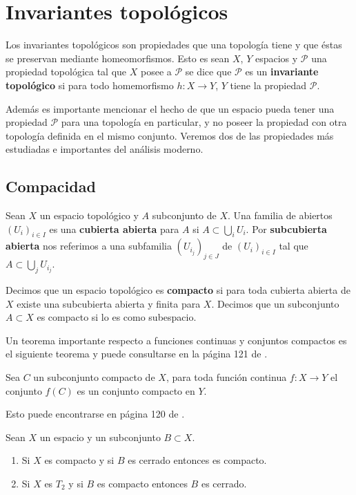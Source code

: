 \section*{Invariantes topológicos}

Los invariantes topológicos son propiedades que una topología tiene y que éstas se preservan mediante homeomorfismos. Esto es sean $X$, $Y$ espacios y $\mathcal{P}$ una propiedad topológica tal que $X$ posee a $\mathcal{P}$ se dice que $\mathcal{P}$ es un \textbf{invariante topológico} si para todo homemorfismo $h:X \to Y$,  $Y$ tiene la propiedad $\mathcal{P}$.


Además es importante mencionar el hecho de que un espacio pueda tener una propiedad $\mathcal{P}$ para una topología en particular, y no poseer la propiedad con otra topología definida en el mismo conjunto. Veremos dos de las  propiedades más estudiadas e 
importantes del análisis moderno. 

\subsection*{Compacidad}

\begin{df}
Sean $X$ un espacio topológico y  $A$ subconjunto de $X$. Una familia de abiertos $(U_i)_{i \in I}$ es una \textbf{cubierta abierta} para $A$ si $A \subset \bigcup_i U_i.$ Por \textbf{subcubierta abierta} nos referimos a una subfamilia $(U_{i_j} )_{j \in J}$ de $(U_i)_{i \in I}$ tal que $ A \subset \bigcup_j U_{i_j}.$

Decimos que un espacio topológico es \textbf{compacto} si para toda cubierta abierta de $X$ existe una subcubierta abierta y finita para $X$. Decimos que un subconjunto $A \subset X$ es compacto si lo es como subespacio.
\end{df}

Un teorema importante respecto a funciones continuas y conjuntos compactos es el siguiente teorema y puede consultarse en la  página 121 de \cite{top_willd}.
 
\begin{te}
Sea $C$ un subconjunto compacto de $X$, para toda función continua $f:X \to Y$ el conjunto $f(C)$ es un conjunto compacto en $Y$.
\end{te}


Esto puede encontrarse en página 120 de \cite{top_willd}. 

\begin{te} 
Sean $X$ un espacio y un subconjunto $B \subset X$. 

	\begin{enumerate}
	\item Si $X$ es compacto y si $B$ es cerrado entonces es compacto. 
	\item Si $X$ es $T_2$ y si $B$ es compacto entonces $B$ es cerrado. 
	\end{enumerate}
	
\end{te}

